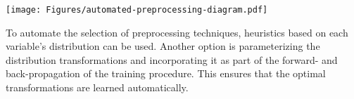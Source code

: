 \documentclass[portrait,final,x11names,a1paper,fontscale=0.4]{baposter}
\newcommand{\mvec}[1]{\mathbf{#1}}
\begin{document}
\begin{poster}
{\noindent
\texttt{[image: Figures/automated-preprocessing-diagram.pdf]} 

\noindent
To automate the selection of preprocessing techniques, heuristics based on each
variable's distribution can be used. Another option is parameterizing the distribution
transformations and incorporating it as part of the forward- and back-propagation of the
training procedure. This ensures that the optimal transformations are learned automatically.


%
%
}


\end{poster}
\end{document}
